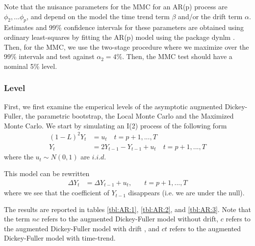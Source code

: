\documentclass[11pt]{article}\usepackage[]{graphicx}\usepackage[]{color}
\newcommand{\pkg}[1]{{\normalfont\fontseries{b}\selectfont #1}}
\begin{document}
Note that the nuisance parameters for the MMC for an AR(p) process are $\phi_2,...\phi_p$, and depend on the model the time trend term $\beta$ and/or the drift term $\alpha$. Estimates and 99\% confidence intervals for these parameters are obtained using ordinary least-squares by fitting the AR(p) model using the package \pkg{dynlm} \citep{zeileis_dynlm:_2014}. Then, for the MMC, we use the two-stage procedure where we maximize over the 99\% intervals and test against $\alpha_2=4\%$. Then, the MMC test should have a nominal 5\% level.

\subsubsection{Level}

First, we first examine the emperical levels of the asymptotic augmented Dickey-Fuller, the parametric bootstrap, the Local Monte Carlo and the Maximized Monte Carlo. We start by simulating an I(2) process of the following form
\begin{align}
	(1-L)^2 Y_t & = u_t \quad t = p + 1, ... , T \\
	Y_t & = 2Y_{t-1}-Y_{t-1} + u_t \quad t = p + 1, ... , T
\end{align}
where the $u_t \sim N(0,1)$ are $i.i.d.$

This model can be rewritten
\begin{align}
	\Delta Y_t & =  \Delta Y_{t-1} + u_t, & \quad t = p + 1, ... , T
\end{align}
where we see that the coefficient of $Y_{t-1}$ disappears (i.e. we are under the null).

The results are reported in tables \ref{tbl:AR:1}, \ref{tbl:AR:2}, and \ref{tbl:AR:3}. Note that the term $nc$ refers to the augmented Dickey-Fuller model without drift, $c$ refers to the augmented Dickey-Fuller model with drift , and $ct$ refers to the augmented Dickey-Fuller model with time-trend.

\begin{table}[H]
	\centering
	\caption{Empirical levels for 250 replications of I(2) process where $\alpha = 5\%$, testing $H_0: \gamma = 0$ against $H_1:  \gamma < 0$}
	\label{tbl:AR:1}
\end{table}
\end{document}
